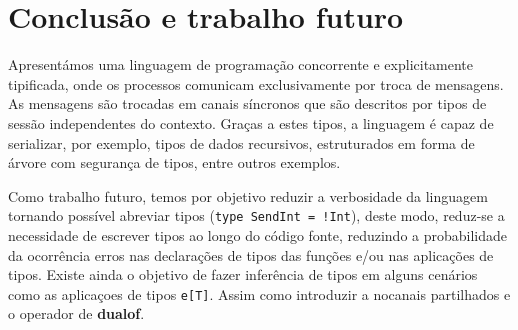 \section{Conclusão e trabalho futuro}
\lstset{language=CFST, style=eclipse}
Apresentámos uma linguagem de programação concorrente e explicitamente tipificada, onde os processos comunicam exclusivamente por troca de mensagens. As mensagens são trocadas em canais síncronos que são descritos por tipos de sessão independentes do contexto. Graças a estes tipos, a linguagem é capaz de serializar, por exemplo, tipos de dados recursivos, estruturados em forma de árvore com segurança de tipos, entre outros exemplos.

Como trabalho futuro, temos por objetivo reduzir a verbosidade da linguagem tornando possível abreviar tipos (\lstinline{type SendInt = !Int}), deste modo, reduz-se a necessidade de escrever tipos ao longo do código fonte, reduzindo a probabilidade da ocorrência erros nas declarações de tipos das funções e/ou nas aplicações de tipos. Existe ainda o objetivo de fazer inferência de tipos em alguns cenários como as aplicaçoes de tipos \lstinline|e[T]|.
 Assim como introduzir a nocanais partilhados e o operador de \textbf{dualof}.
 
